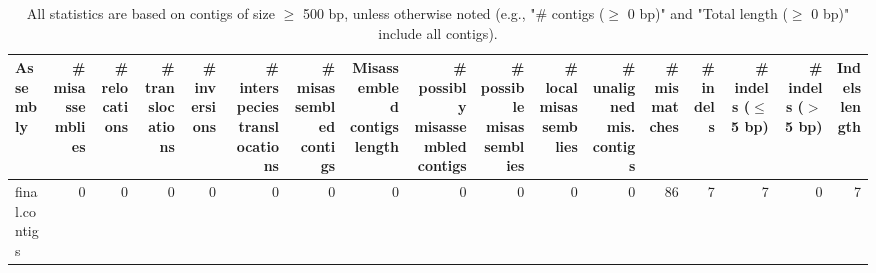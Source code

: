 \documentclass[12pt,a4paper]{article}
\begin{document}
\begin{table}[ht]
\begin{center}
\caption{All statistics are based on contigs of size $\geq$ 500 bp, unless otherwise noted (e.g., "\# contigs ($\geq$ 0 bp)" and "Total length ($\geq$ 0 bp)" include all contigs).}
\begin{tabular}{|l*{16}{|r}|}
\hline
Assembly & \# misassemblies &     \# relocations &     \# translocations &     \# inversions &     \# interspecies translocations & \# misassembled contigs & Misassembled contigs length & \# possibly misassembled contigs &     \# possible misassemblies & \# local misassemblies & \# unaligned mis. contigs & \# mismatches & \# indels &     \# indels ($\leq$ 5 bp) &     \# indels ($>$ 5 bp) & Indels length \\ \hline
final.contigs & 0 & 0 & 0 & 0 & 0 & 0 & 0 & 0 & 0 & 0 & 0 & 86 & 7 & 7 & 0 & 7 \\ \hline
\end{tabular}
\end{center}
\end{table}
\end{document}
